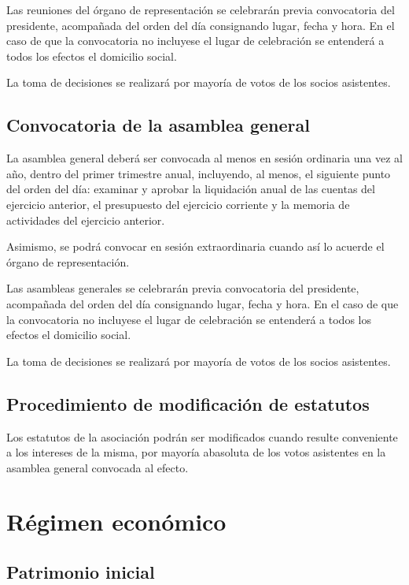 \documentclass[a4paper, 12pt, oneside]{book}
\begin{document}
Las reuniones del órgano de representación se celebrarán previa convocatoria del presidente, acompañada del orden del día consignando lugar, fecha y hora. En el caso de que la convocatoria no incluyese el lugar de celebración se entenderá a todos los efectos el domicilio social.

La toma de decisiones se realizará por mayoría de votos de los socios asistentes.

\section{Convocatoria de la asamblea general}

La asamblea general deberá ser convocada al menos en sesión ordinaria una vez al año, dentro del primer trimestre anual, incluyendo, al menos, el siguiente punto del orden del día: examinar y aprobar la liquidación anual de las cuentas del ejercicio anterior, el presupuesto del ejercicio corriente y la memoria de actividades del ejercicio anterior.

Asimismo, se podrá convocar en sesión extraordinaria cuando así lo acuerde el órgano de representación.

Las asambleas generales se celebrarán previa convocatoria del presidente, acompañada del orden del día consignando lugar, fecha y hora. En el caso de que la convocatoria no incluyese el lugar de celebración se entenderá a todos los efectos el domicilio social.

La toma de decisiones se realizará por mayoría de votos de los socios asistentes.

\section{Procedimiento de modificación de estatutos}

Los estatutos de la asociación podrán ser modificados cuando resulte conveniente a los intereses de la misma, por mayoría abasoluta de los votos asistentes en la asamblea general convocada al efecto.

\chapter{Régimen económico}

\section{Patrimonio inicial}
\end{document}

